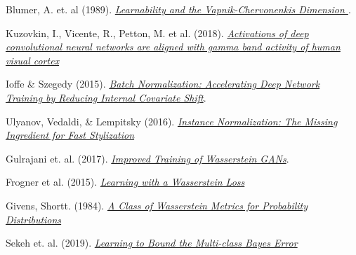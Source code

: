 \documentclass[paper=a4, fontsize=12pt]{scrartcl} %
\numberwithin{equation}{section} %
\numberwithin{figure}{section} %
\numberwithin{table}{section} %
\begin{document}
\begin{thebibliography}{999}

        Blumer, A. et. al (1989).
        \emph{\href{http://www.trhvidsten.com/docs/classics/Blumer-1989.pdf}{Learnability and the Vapnik-Chervonenkis Dimension }}.

        Kuzovkin, I., Vicente, R., Petton, M. et al. (2018).
        \emph{\href{https://www.nature.com/articles/s42003-018-0110-y}{Activations of deep convolutional neural networks are aligned with gamma band activity of human visual cortex}}

        Ioffe \& Szegedy (2015).
        \emph{\href{https://arxiv.org/abs/1502.03167}{Batch Normalization: Accelerating Deep Network Training by Reducing Internal Covariate Shift}}.

        Ulyanov, Vedaldi, \& Lempitsky (2016).
        \emph{\href{https://arxiv.org/abs/1607.08022}{Instance Normalization: The Missing Ingredient for Fast Stylization}}

        Gulrajani et. al. (2017).
        \emph{\href{https://arxiv.org/abs/1607.08022}{Improved Training of Wasserstein GANs}}.

        Frogner et al. (2015).
        \emph{\href{https://arxiv.org/abs/1506.05439}{Learning with a Wasserstein Loss}}

        Givens, Shortt. (1984).
        \emph{\href{https://projecteuclid.org/download/pdf_1/euclid.mmj/1029003026}{A Class of Wasserstein Metrics for Probability Distributions}}

        Sekeh et. al. (2019).
        \emph{\href{https://arxiv.org/pdf/1811.06419.pdf}{Learning to Bound the Multi-class Bayes Error}}

\end{thebibliography}

\vfill

\end{document}
